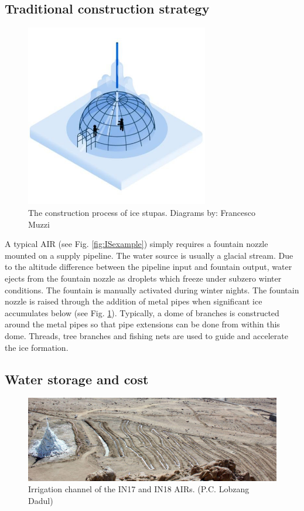 \subsection{Traditional construction strategy}

\begin{figure}[htb]
\centering
\includegraphics[width=8cm]{figs/IS_science.jpg}
\caption{The construction process of ice stupas. Diagrams by: Francesco Muzzi }
\label{fig:ISconstruction}
\end{figure}

A typical AIR (see Fig. \ref{fig:ISexample}) simply requires a fountain nozzle mounted on a supply pipeline. The
water source is usually a glacial stream. Due to the altitude difference between the pipeline input and fountain
output, water ejects from the fountain nozzle as droplets which freeze under subzero winter conditions. The
fountain is manually activated during winter nights. The fountain nozzle is raised through the addition of metal
pipes when significant ice accumulates below (see Fig. \ref{fig:ISconstruction}).  Typically, a dome of branches
is constructed around the metal pipes so that pipe extensions can be done from within this dome. Threads, tree
branches and fishing nets are used to guide and accelerate the ice formation.

\subsection{Water storage and cost}

\begin{figure}[htb]
\centering
\includegraphics[width=12cm]{figs/IS_irrigation.jpeg}

\caption{Irrigation channel of the IN17 and IN18 AIRs. (P.C. Lobzang Dadul) }

\label{fig:ISirrigation}
\end{figure}

